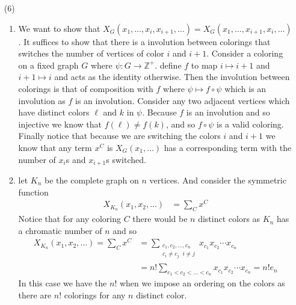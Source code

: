 \documentclass[12pt]{amsart}
\theoremstyle{definition}
\newcommand{\Z}{\mathbb{Z}}
\newcommand{\ra}{\rightarrow}
\begin{document}
\begin{itemize}
\item[(6)]
\begin{enumerate}[label=(\alph*)]
    \item %
    We want to show that $X_G(x_1,\dots,x_i,x_{i+1},\dots)=X_G(x_1,\dots,x_{i+1}, x_i,\dots)$. It suffices to show that there is a involution between colorings that switches the number of vertices of color $i$ and $i+1$. Consider a coloring on a fixed graph $G$ where $\psi:G\ra \Z^+$. define $f$ to map $i\mapsto i+1$ and $i+1\mapsto i$ and acts as the identity otherwise. Then the involution between colorings is that of composition with $f$ where $\psi\mapsto f\circ\psi$ which is an involution as $f$ is an involution. Consider any two adjacent vertices which have distinct colors $\ell$ and $k$ in $\psi$. Because $f$ is an involution and so injective we know that $f(\ell)\neq f(k)$, and so $f\circ\psi$ is a valid coloring. Finally notice that because we are switching the colors $i$ and $i+1$ we know that any term $x^C$ is $X_G(x_1,\dots)$ has a corresponding term with the number of $x_i$s and $x_{i+1}$s switched.\\

    \item %
    let $K_n$ be the complete graph on $n$ vertices. And consider the symmetric function
    \begin{align*}
        X_{K_n}(x_1,x_2,\dots)&=\sum_{C}x^C
    \end{align*}
    Notice that for any coloring $C$ there would be $n$ distinct colors as $K_n$ has a chromatic number of $n$ and so
    \begin{align*}
        X_{K_n}(x_1,x_2,\dots)=\sum_{C}x^C&=\sum_{\substack{c_1,c_2,\dots, c_n\\c_i\neq c_j\;\; i\neq j}}x_{c_1}x_{c_2}\cdots x_{c_n}\\
        &=n!\sum_{c_1<c_2<\dots<c_n}x_{c_1}x_{c_2}\cdots x_{c_n}=n!e_n
    \end{align*}
In this case we have the $n!$ when we impose an ordering on the colors as there are $n!$ colorings for any $n$ distinct color.
\end{enumerate}
\end{itemize}
\end{document}
